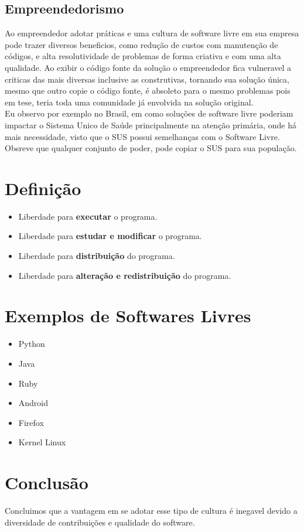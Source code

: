\documentclass[12pt, onecolumn]{article}
\begin{document}
        \subsection{Empreendedorismo}
            \hspace{2cm}    Ao empreendedor adotar práticas e uma cultura de software livre em sua empresa pode trazer diversos 
                beneficios, como redução de custos com manutenção de códigos, e alta resolutividade de problemas de forma criativa
                e com uma alta qualidade. Ao exibir o código fonte da solução o empreendedor fica vulneravel a criticas das mais diversas
                inclusive as construtivas, tornando sua solução única, mesmo que outro copie o código fonte, é absoleto para o mesmo problemas
                pois em tese, teria toda uma comunidade já envolvida na solução original. \\
            \hspace{2cm}    Eu observo por exemplo no Brasil, em como soluções de software livre poderiam impactar o Sistema Unico de Saúde
                principalmente na atenção primária, onde há mais necessidade, visto que o SUS possui semelhanças com o Software Livre.
                Obsreve que qualquer conjunto de poder, pode copiar o SUS para sua população.

    \section{Definição}
        \begin{itemize}
            \item Liberdade para {\bf executar} o programa.
            \item Liberdade para {\bf estudar e modificar} o programa.
            \item Liberdade para {\bf distribuição} do programa.
            \item Liberdade para {\bf alteração e redistribuição} do programa.
        \end{itemize}

    \section{Exemplos de Softwares Livres}
        \begin{itemize}
            \item Python
            \item Java
            \item Ruby
            \item Android
            \item Firefox
            \item Kernel Linux
        \end{itemize}
        
    \section{Conclusão}
        \hspace{2cm} Concluimos que a vantagem em se adotar esse tipo de cultura é inegavel devido a diversidade de contribuições 
        e qualidade do software.
\end{document}
